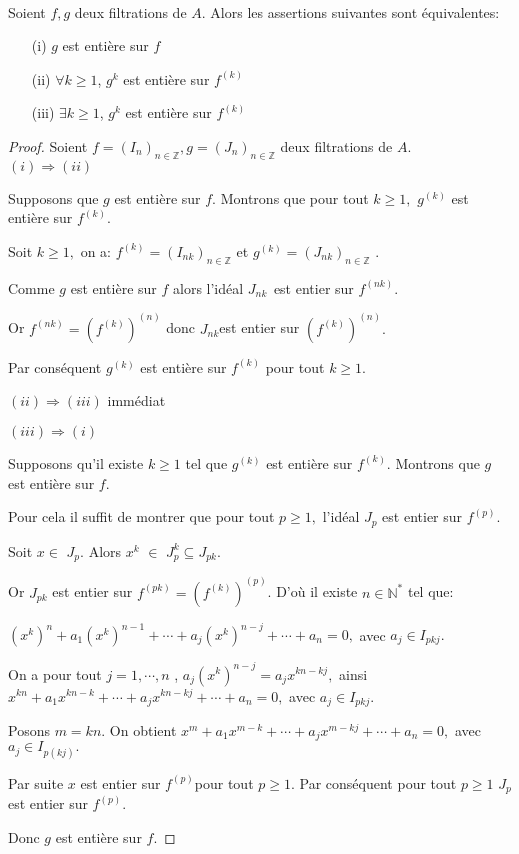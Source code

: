 \begin{maproposition} \cite{Di2} \\
	Soient $f,g$ deux filtrations de $A$. Alors les assertions suivantes sont équivalentes:
	\begin{enumerate}
		\item[(i)] $g$ est entière sur $f$
		\item[(ii)] $\forall k \geqslant 1$, $g^{k}$ est entière sur $f^{(k)}$
		\item[(iii)] $\exists k \geqslant 1$, $g^{k}$ est entière sur $f^{(k)}$
	\end{enumerate}
\end{maproposition}
\begin{proof}
	Soient $f=(I_n)_{n \in \mathbb{Z}},g=(J_n)_{n \in \mathbb{Z}}$ deux filtrations de $A$. \\
	$(i)\Longrightarrow (ii)$
	
	Supposons que $g$ est entière sur $f.$ Montrons que pour tout $k\geq 1,$ $g^{(k)}$ est entière sur $f^{(k)}.$
	
	Soit $k\geq 1,$ on a: $f^{(k)}=(I_{nk})_{n\in \mathbb{Z}}$ et $g^{(k)}=(J_{nk})_{n\in \mathbb{Z}}$ .
	
	Comme $g$ est entière sur $f$ alors l'idéal $J_{nk\text{ }}$est entier sur $f^{(nk)}.$
	
	Or $f^{(nk)}=(f^{(k)})^{(n)}$ donc $J_{nk}$est entier sur $(f^{(k)})^{(n)}.$
	
	Par conséquent $g^{(k)}$ est entière sur $f^{(k)}$ pour tout $k\geq 1.$
	
	$(ii)\Longrightarrow (iii)$ immédiat
	
	$(iii)\Longrightarrow (i)$
	
	Supposons qu'il existe $k\geq 1$ tel que $g^{(k)}$ est entière sur $f^{(k)}$. Montrons que $g$ est entière sur $f.$
	
	Pour cela il suffit de montrer que pour tout $p\geq 1,$ l'idéal $J_{p}$ est entier sur $f^{(p)}.$
	
	Soit $x\in $ $J_{p}.$ Alors $x^{k}$ $\in $ $J_{p}^{k}\subseteq J_{pk}.$
	
	Or $J_{pk}$ est entier sur $f^{(pk)}=(f^{(k)})^{(p)}$. D'où il existe $n\in \mathbb{N}^{\ast }$ tel que:
	
	$(x^{k})^{n}+a_{1}(x^{k})^{n-1}+\cdots +a_{j}(x^{k})^{n-j}+\cdots +a_{n}=0,$ avec $a_{j}\in I_{pkj}.$
	
	On a pour tout $j=1,\cdots ,n$ , $a_{j}(x^{k})^{n-j}=a_{j}x^{kn-kj},$ ainsi $x^{kn}+a_{1}x^{kn-k}+\cdots +a_{j}x^{kn-kj}+\cdots +a_{n}=0,$ avec $a_{j}\in I_{pkj}.$
	
	Posons $m=kn.$ On obtient $x^{m}+a_{1}x^{m-k}+\cdots +a_{j}x^{m-kj}+\cdots +a_{n}=0,$ avec $a_{j}\in I_{p(kj)}.$
	
	Par suite $x$ est entier sur $f^{(p)}$pour tout $p\geq 1.$ Par conséquent pour tout $p\geq 1$ $J_{p}$ est entier sur $f^{(p)}.$
	
	Donc $g$ est entière sur $f.$
	
\end{proof}

